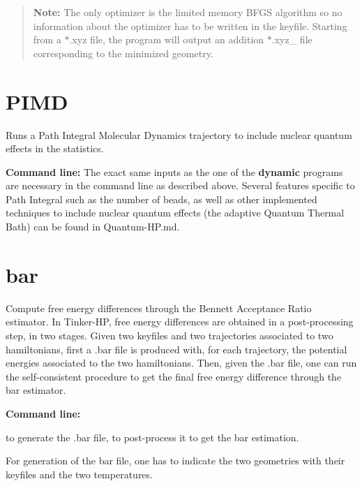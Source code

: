 \begin{quotation}
{\bfseries Note\-:} The only optimizer is the limited memory B\-F\-G\-S algorithm so no information about the optimizer has to be written in the keyfile. Starting from a $\ast$.xyz file, the program will output an addition $\ast$.xyz\-\_ file corresponding to the minimized geometry.

\end{quotation}
\hypertarget{md_binaries_doxygen_program_pimd}{}\section{P\-I\-M\-D}\label{md_binaries_doxygen_program_pimd}
Runs a Path Integral Molecular Dynamics trajectory to include nuclear quantum effects in the statistics.
\begin{DoxyItemize}
\item {\bfseries Command line\-:} The exact same inputs as the one of the {\bfseries dynamic} programs are necessary in the command line as described above. Several features specific to Path Integral such as the number of beads, as well as other implemented techniques to include nuclear quantum effects (the adaptive Quantum Thermal Bath) can be found in {\ttfamily Quantum-\/\-H\-P.\-md}.
\end{DoxyItemize}\hypertarget{md_binaries_doxygen_program_bar}{}\section{bar}\label{md_binaries_doxygen_program_bar}
Compute free energy differences through the Bennett Acceptance Ratio estimator. In Tinker-\/\-H\-P, free energy differences are obtained in a post-\/processing step, in two stages. Given two keyfiles and two trajectories associated to two hamiltonians, first a {\ttfamily .bar} file is produced with, for each trajectory, the potential energies associated to the two hamiltonians. Then, given the {\ttfamily .bar} file, one can run the self-\/consistent procedure to get the final free energy difference through the bar estimator.


\begin{DoxyItemize}
\item {\bfseries Command line\-:}
\begin{DoxyItemize}
\item {} to generate the {\ttfamily .bar} file, {} to post-\/process it to get the bar estimation.
\item For generation of the bar file, one has to indicate the two geometries with their keyfiles and the two temperatures.
\end{DoxyItemize}
\end{DoxyItemize}

